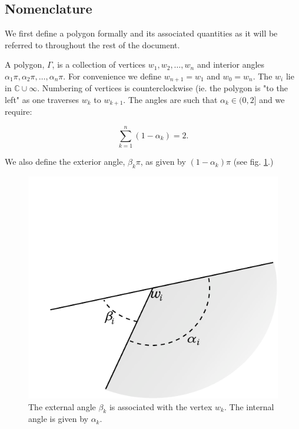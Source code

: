 \documentclass[a4paper,10pt]{amsart}
\begin{document}
\subsection{Nomenclature}

We first define a polygon formally and its associated quantities as it will be referred to throughout the rest of the document.

A polygon, $\Gamma$, is a collection of vertices $w_1, w_2,\dots,w_n$ and interior angles $\alpha_1\pi, \alpha_2\pi, \dots, \alpha_n\pi$. For convenience we define $w_{n+1} = w_1$ and $w_0=w_n$. The $w_i$ lie in $\mathbb{C} \cup {\infty}$. Numbering of vertices is counterclockwise (ie. the polygon is "to the left" as one traverses $w_k$ to $w_{k+1}$. The angles are such that $\alpha_k \in (0,2]$ and we require:

\begin{equation}
\sum_{k=1}^n (1-\alpha_k) = 2.
\end{equation}

We also define the exterior angle, $\beta_k\pi$, as given by $(1-\alpha_k)\pi$ (see fig. \ref{anglediagram}.)

\begin{figure} [bp]
\centering
\includegraphics[scale=0.6]{figs/anglediagram.pdf}
\caption{The external angle $\beta_k$ is associated with the vertex $w_k$. The internal angle is given by $\alpha_k$.}
\label{anglediagram}
\end{figure}
\end{document}
